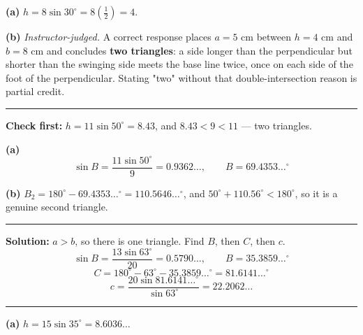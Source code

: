 \documentclass[12pt]{article}
\begin{document}

\textbf{(a)} $h = 8\sin 30^\circ = 8\left(\tfrac{1}{2}\right) = 4$. 

\textbf{(b)} \emph{Instructor-judged.} A correct response places $a = 5$ cm between $h = 4$ cm and $b = 8$ cm and concludes \textbf{two triangles}: a side longer than the perpendicular but shorter than the swinging side meets the base line twice, once on each side of the foot of the perpendicular. Stating "two" without that double-intersection reason is partial credit.

\vspace{0.1cm}\noindent\rule{\linewidth}{0.2pt}\vspace{0.1cm}


\textbf{Check first:} $h = 11\sin 50^\circ = 8.43$, and $8.43 < 9 < 11$ --- two triangles.

\textbf{(a)} \[ \sin B = \frac{11\sin 50^\circ}{9} = 0.9362\ldots, \qquad B = 69.4353\ldots^\circ \]

\textbf{(b)} $B_2 = 180^\circ - 69.4353\ldots^\circ = 110.5646\ldots^\circ$, and $50^\circ + 110.56^\circ < 180^\circ$, so it is a genuine second triangle. 

\vspace{0.1cm}\noindent\rule{\linewidth}{0.2pt}\vspace{0.1cm}


\textbf{Solution:} $a > b$, so there is one triangle. Find $B$, then $C$, then $c$.
\[ \sin B = \frac{13\sin 63^\circ}{20} = 0.5790\ldots, \qquad B = 35.3859\ldots^\circ \]
\[ C = 180^\circ - 63^\circ - 35.3859\ldots^\circ = 81.6141\ldots^\circ \]
\[ c = \frac{20\sin 81.6141\ldots^\circ}{\sin 63^\circ} = 22.2062\ldots \]

\vspace{0.1cm}\noindent\rule{\linewidth}{0.2pt}\vspace{0.1cm}


\textbf{(a)} $h = 15\sin 35^\circ = 8.6036\ldots$ 
\end{document}
